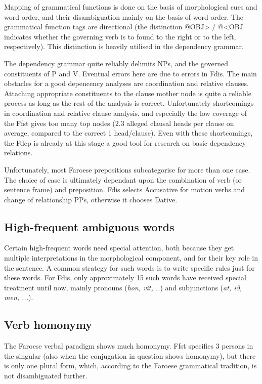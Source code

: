 \documentclass[11pt]{article}
\begin{document}
Mapping of grammatical functions is done on the basis of morphological cues and word order, and their disambiguation mainly on the basis of word order. The grammatical function tags are directional (the distinction @OBJ> / @<OBJ indicates whether the governing verb is to found to the right or to the left, respectively). This distinction is heavily utilised in the dependency grammar.

The dependency grammar quite reliably delimits NPs, and the governed constituents of P and V. Eventual errors here are due to errors in Fdis. The main obstacles for a good depencency analyses are coordination and relative clauses. Attaching appropriate constituents to the clause mother node is quite a reliable process as long as the rest of the analysis is correct. Unfortunately shortcomings in coordination and relative clause analysis, and especially the low coverage of the Ffst gives too many top nodes (2.3 alleged clausal heads per clause on average, compared to the correct 1 head/clause). Even with these shortcomings, the Fdep is already at this stage a good tool for research on basic dependency relations.

Unfortunately, most Faroese prepositions subcategorise for more than one case.  The choice of case is ultimately dependant upon the combination of verb (or sentence frame) and preposition.  Fdis selects Accusative for motion verbs and change of relationship PPs, otherwise it chooses Dative.

\subsection{High-frequent ambiguous words}

Certain high-frequent words need special attention, both because they get multiple interpretations in the morphological component, and for their key role in the sentence. A common strategy for such words is to write specific rules just for these words.  For Fdis, only approximately 15 such words have received special treatment until now, mainly pronouns (\textit{hon, vit, ..}) and subjunctions (\textit{at, ið, men, ...}).

\subsection{Verb homonymy}

The Faroese verbal paradigm shows much homonymy.  Ffst specifies 3 persons in the singular (also when the conjugation in question shows homonymy), but there is only one plural form, which, according to the Faroese grammatical tradition, is not disambiguated further.
\end{document}
